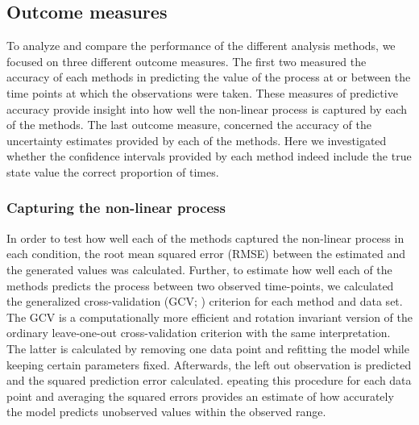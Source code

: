 
\subsection{Outcome measures}

To analyze and compare the performance of the different analysis methods, we
focused on three different outcome measures. The first two measured the
accuracy of each methods in predicting the value of
the process at or between the time points at which the observations
were taken. These measures of predictive accuracy provide insight into how
well the non-linear process is captured by each of the methods. The last
outcome measure, concerned the accuracy of the uncertainty estimates provided
by each of the methods. Here we investigated whether the confidence intervals
provided by each method indeed include the true state value the correct
proportion of times.

\subsubsection{Capturing the non-linear process}

In order to test how well each of the methods captured the non-linear process
in each condition, the root mean squared error (RMSE)
between the estimated and the generated values was calculated. Further, to
estimate how well each of the methods predicts the process between two observed
time-points, we calculated the generalized cross-validation
(GCV; \textcite{golub_generalized_1979}) criterion
for each method and data set. The GCV is a computationally more efficient and
rotation invariant version of the ordinary leave-one-out cross-validation
criterion with the same interpretation. The latter is calculated by
removing one data point and refitting the
model while keeping certain parameters fixed. Afterwards, the left out
observation is predicted and the squared prediction error calculated.
epeating this procedure for each data point and averaging the
squared errors provides an estimate of how accurately the model predicts
unobserved values within the observed range.

